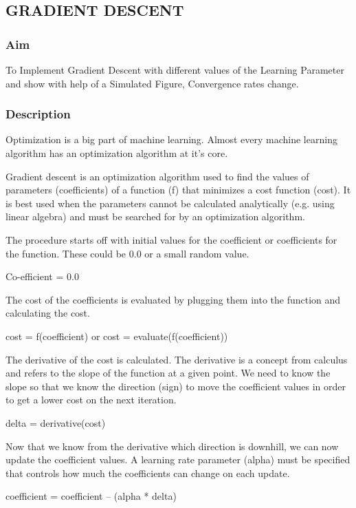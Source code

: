 \documentclass[12pt,a4paper]{article}
\begin{document}
\subsection{GRADIENT DESCENT}

\subsubsection{Aim}
\quad \quad To Implement Gradient Descent with different values of the Learning Parameter and show with help of a Simulated Figure, Convergence rates change.


\subsubsection{Description}

\quad \quad Optimization is a big part of machine learning. Almost every machine learning algorithm has an optimization algorithm at it’s core.

\quad Gradient descent is an optimization algorithm used to find the values of parameters (coefficients) of a function (f) that minimizes a cost function (cost). It is best used when the parameters cannot be calculated analytically (e.g. using linear algebra) and must be searched for by an optimization algorithm. 

\quad The procedure starts off with initial values for the coefficient or coefficients for the function. These could be 0.0 or a small random value. 
\begin{center}
Co-efficient = 0.0 
\end{center}

\quad The cost of the coefficients is evaluated by plugging them into the function and calculating the cost. 
\begin{center}
cost = f(coefficient)       or           cost = evaluate(f(coefficient)) 
\end{center}

\quad The derivative of the cost is calculated. The derivative is a concept from calculus and refers to the slope of the function at a given point. We need to know the slope so that we know the direction (sign) to move the coefficient values in order to get a lower cost on the next iteration. 
\begin{center}
delta = derivative(cost) 
\end{center}

\quad Now that we know from the derivative which direction is downhill, we can now update the coefficient values. A learning rate parameter (alpha) must be specified that controls how much the coefficients can change on each update. 
\begin{center}
coefficient = coefficient – (alpha * delta) 
\end{center}
\end{document}
